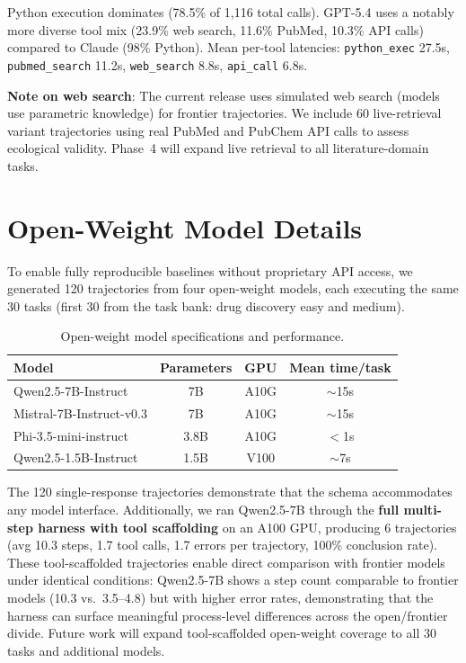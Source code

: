 \documentclass{article}
\begin{document}
Python execution dominates (78.5\% of 1,116 total calls). GPT-5.4 uses a notably more diverse tool mix (23.9\% web search, 11.6\% PubMed, 10.3\% API calls) compared to Claude (98\% Python). Mean per-tool latencies: \texttt{python\_exec} 27.5s, \texttt{pubmed\_search} 11.2s, \texttt{web\_search} 8.8s, \texttt{api\_call} 6.8s.

\textbf{Note on web search}: The current release uses simulated web search (models use parametric knowledge) for frontier trajectories. We include 60 live-retrieval variant trajectories using real PubMed and PubChem API calls to assess ecological validity. Phase~4 will expand live retrieval to all literature-domain tasks.

\section{Open-Weight Model Details}
\label{app:openweight}

To enable fully reproducible baselines without proprietary API access, we generated 120 trajectories from four open-weight models, each executing the same 30 tasks (first 30 from the task bank: drug discovery easy and medium).

\begin{table}[h]
\caption{Open-weight model specifications and performance.}
\label{tab:openweight}
\centering\small
\begin{tabular}{lccc}
\toprule
\textbf{Model} & \textbf{Parameters} & \textbf{GPU} & \textbf{Mean time/task} \\
\midrule
Qwen2.5-7B-Instruct & 7B & A10G & ${\sim}$15s \\
Mistral-7B-Instruct-v0.3 & 7B & A10G & ${\sim}$15s \\
Phi-3.5-mini-instruct & 3.8B & A10G & ${<}$1s \\
Qwen2.5-1.5B-Instruct & 1.5B & V100 & ${\sim}$7s \\
\bottomrule
\end{tabular}
\end{table}

The 120 single-response trajectories demonstrate that the schema accommodates any model interface. Additionally, we ran Qwen2.5-7B through the \textbf{full multi-step harness with tool scaffolding} on an A100 GPU, producing 6 trajectories (avg 10.3 steps, 1.7 tool calls, 1.7 errors per trajectory, 100\% conclusion rate). These tool-scaffolded trajectories enable direct comparison with frontier models under identical conditions: Qwen2.5-7B shows a step count comparable to frontier models (10.3 vs.\ 3.5--4.8) but with higher error rates, demonstrating that the harness can surface meaningful process-level differences across the open/frontier divide. Future work will expand tool-scaffolded open-weight coverage to all 30 tasks and additional models.
\end{document}
